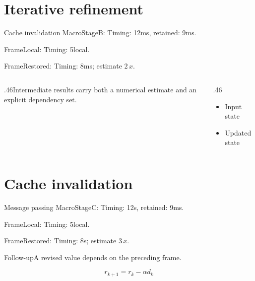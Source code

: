 \documentclass[10pt,aspectratio=43]{beamer}
\newcommand{\fuzzlayerA}[1]{\textrm{#1}}
\newcommand{\fuzzlayerB}[1]{\fuzzlayerA{#1}}
\newcommand{\fuzzterm}[1]{\fuzzlayerB{#1}}
\newcommand{\fuzzpair}[2]{\fuzzterm{#1}: #2}
\newcommand{\fuzzunit}{ms}
\let\fuzzoriginalunit\fuzzunit
\newcommand{\fuzzcoefficient}{2}
\newcommand{\fuzzscale}[2][\fuzzcoefficient]{#1\,#2}
\begin{document}
\section{Iterative refinement}
\begin{frame}[t]{Cache invalidation}
\fuzzpair{MacroStageB}{Timing: 12\fuzzunit, retained: 9\fuzzoriginalunit.}\par
{\renewcommand{\fuzzunit}{local}\fuzzpair{FrameLocal}{Timing: 5\fuzzunit.}\par}
\fuzzpair{FrameRestored}{Timing: 8\fuzzunit; estimate $\fuzzscale{x}$.}\par
\begin{columns}[T]\begin{column}{.46\textwidth}Intermediate results carry both a numerical estimate and an explicit dependency set.\end{column}\begin{column}{.46\textwidth}\begin{itemize}\item Input state\item Updated state\end{itemize}\end{column}\end{columns}
\end{frame}
\renewcommand{\fuzzunit}{s}
\renewcommand{\fuzzcoefficient}{3}
\renewcommand{\fuzzterm}[1]{{\textrm{#1}}}
\section{Cache invalidation}
\begin{frame}[t]{Message passing}
\fuzzpair{MacroStageC}{Timing: 12\fuzzunit, retained: 9\fuzzoriginalunit.}\par
{\renewcommand{\fuzzunit}{local}\fuzzpair{FrameLocal}{Timing: 5\fuzzunit.}\par}
\fuzzpair{FrameRestored}{Timing: 8\fuzzunit; estimate $\fuzzscale{x}$.}\par
\begin{block}{Follow-up}\fuzzterm{A revised value} depends on the preceding frame.\end{block}
\[r_{k+1}=r_k-\alpha d_k\]
\end{frame}
\end{document}
